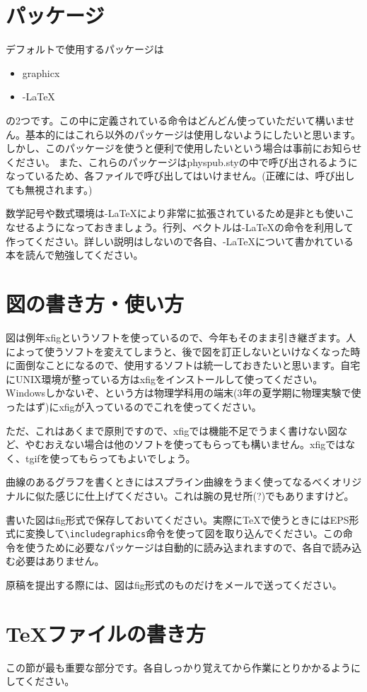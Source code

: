 \documentclass[a4j]{jarticle}
\begin{document}
\section{パッケージ}
デフォルトで使用するパッケージは
\begin{itemize}
\item graphicx
\item \AmS-\LaTeX
\end{itemize}
の2つです。この中に定義されている命令はどんどん使っていただいて構いません。基本的にはこれら以外のパッケージは使用しないようにしたいと思います。しかし、このパッケージを使うと便利で使用したいという場合は事前にお知らせください。
また、これらのパッケージはphyspub.styの中で呼び出されるようになっているため、各ファイルで呼び出してはいけません。(正確には、呼び出しても無視されます。)

数学記号や数式環境は\AmS-\LaTeX により非常に拡張されているため是非とも使いこなせるようになっておきましょう。行列、ベクトルは\AmS-\LaTeX の命令を利用して作ってください。詳しい説明はしないので各自、\AmS-\LaTeX について書かれている本を読んで勉強してください。


\section{図の書き方・使い方}
図は例年xfigというソフトを使っているので、今年もそのまま引き継ぎます。人によって使うソフトを変えてしまうと、後で図を訂正しないといけなくなった時に面倒なことになるので、使用するソフトは統一しておきたいと思います。自宅にUNIX環境が整っている方はxfigをインストールして使ってください。Windowsしかないぞ、という方は物理学科用の端末(3年の夏学期に物理実験で使ったはず)にxfigが入っているのでこれを使ってください。

ただ、これはあくまで原則ですので、xfigでは機能不足でうまく書けない図など、やむおえない場合は他のソフトを使ってもらっても構いません。xfigではなく、tgifを使ってもらってもよいでしょう。

曲線のあるグラフを書くときにはスプライン曲線をうまく使ってなるべくオリジナルに似た感じに仕上げてください。これは腕の見せ所(?)でもありますけど。

書いた図はfig形式で保存しておいてください。実際に\TeX で使うときにはEPS形式に変換して\verb|\includegraphics|命令を使って図を取り込んでください。この命令を使うために必要なパッケージは自動的に読み込まれますので、各自で読み込む必要はありません。

原稿を提出する際には、図はfig形式のものだけをメールで送ってください。


\section{\TeX ファイルの書き方}
この節が最も重要な部分です。各自しっかり覚えてから作業にとりかかるようにしてください。
\end{document}
